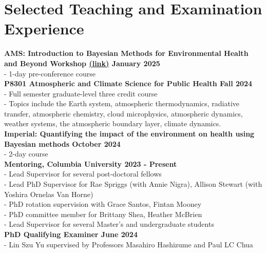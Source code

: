 \section*{Selected Teaching and Examination Experience}

\noindent \textbf{AMS: Introduction to Bayesian Methods for Environmental Health and Beyond Workshop \href{https://www.ametsoc.org/index.cfm/ams/education-careers/careers/professional-development/short-courses/introduction-to-bayesian-methods-for-environmental-health-and-beyond/}{(link)} \hfill January 2025}\\
\noindent - 1-day pre-conference course\\

\noindent \textbf{P8301 Atmospheric and Climate Science for Public Health \hfill Fall 2024}\\
\noindent - Full semester graduate-level three credit course\\
\noindent - Topics include the Earth system, atmospheric thermodynamics, radiative transfer, atmospheric chemistry, cloud microphysics, atmospheric dynamics, weather systems, the atmospheric boundary layer, climate dynamics.\\


\noindent \textbf{Imperial: Quantifying the impact of the environment on health using Bayesian methods \hfill October 2024}\\
\noindent - 2-day course\\

\noindent \textbf{Mentoring, Columbia University \hfill 2023 - Present}\\
\noindent - Lead Supervisor for several post-doctoral fellows\\
\noindent - Lead PhD Supervisor for Rae Spriggs (with Annie Nigra), Allison Stewart (with Yoshira Ornelas Van Horne)\\
\noindent - PhD rotation supervision with Grace Santos, Fintan Mooney\\
\noindent - PhD committee member for Brittany Shea, Heather McBrien\\
\noindent - Lead Supervisor for several Master's and undergraduate students\\

\noindent \textbf{PhD Qualifying Examiner \hfill June 2024}\\
\noindent - Lin Szu Yu supervised by Professors Masahiro Hashizume and Paul LC Chua\\


